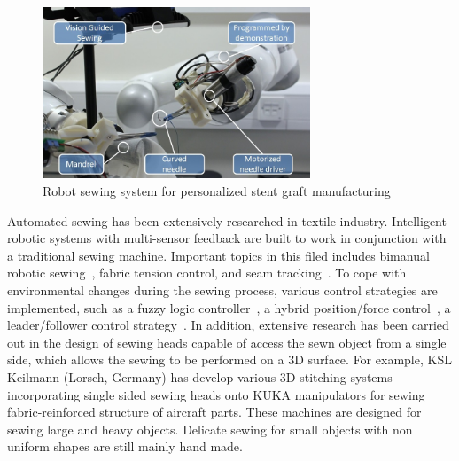 \begin{figure}
\centering
{
\includegraphics[width=8cm]{./fig/setup_label.jpg}
\caption{Robot sewing system for personalized stent graft manufacturing}
\label{fig:setup}}
\end{figure}


Automated sewing has been extensively researched in textile industry. Intelligent robotic systems with multi-sensor feedback are built to work in conjunction with a traditional sewing machine. Important topics in this filed includes bimanual robotic sewing~\cite{kudo2000multi}, fabric tension control, and seam tracking~\cite{schrimpf2012experiments, schrimpf2012real}. To cope with environmental changes during the sewing process, various control strategies are implemented, such as a fuzzy logic controller~\cite{koustoumpardis2006intelligent}, a hybrid position/force control~\cite{kudo2000multi}, a leader/follower control strategy~\cite{schrimpf2014velocity}. In addition, extensive research has been carried out in the design of sewing heads capable of access the sewn object from a single side, which allows the sewing to be performed on a 3D surface. For example, KSL Keilmann (Lorsch, Germany) has develop various 3D stitching systems incorporating single sided sewing heads onto KUKA manipulators for sewing fabric-reinforced structure of aircraft parts. These machines are designed for sewing large and heavy objects. Delicate sewing for small objects with non uniform shapes are still mainly hand made.

